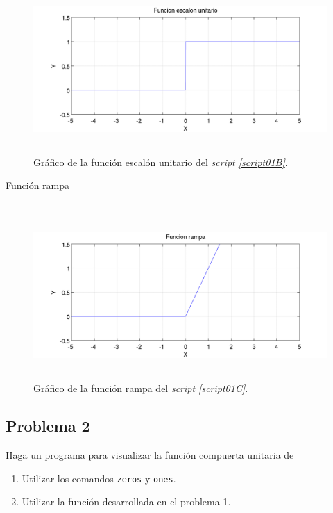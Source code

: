 \documentclass[a4paper,12pt,final]{article}
\begin{document}
      \begin{figure}[H]
        \caption{Gráfico de la función escalón unitario del \emph{script \ref{script01B}}.}
        \label{script01Bfigure}
        \includegraphics[height=2.5in]{./laboratorio_2/problema01_b.png}
      \end{figure}

      \begin{listing}[H]
        \caption{Función rampa}
        \label{script01C}
        \inputminted{matlab}{./laboratorio_2/rampa.m}
      \end{listing}

      \begin{figure}[H]
        \caption{Gráfico de la función rampa del \emph{script \ref{script01C}}.}
        \label{script01Cfigure}
        \includegraphics[height=2.5in]{./laboratorio_2/problema01_c.png}
      \end{figure}
      \vspace{\fill}

  \newpage
  \subsection*{Problema 2}
    \noindent Haga un programa para visualizar la función compuerta unitaria de
    \begin{enumerate}
      \item Utilizar los comandos \texttt{zeros} y \texttt{ones}.
      \item Utilizar la función desarrollada en el problema 1.
    \end{enumerate}
\end{document}
